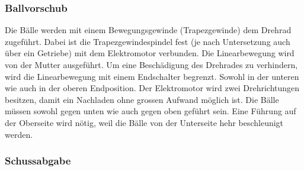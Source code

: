 \subsubsection{Ballvorschub}
Die Bälle werden mit einem Bewegungsgewinde (Trapezgewinde) dem Drehrad zugeführt. Dabei ist die Trapezgewindespindel fest (je nach Untersetzung auch über ein Getriebe) mit dem Elektromotor verbunden. Die Linearbewegung wird von der Mutter ausgeführt. Um eine Beschädigung des Drehrades zu verhindern, wird die Linearbewegung mit einem Endschalter begrenzt. Sowohl in der unteren wie auch in der oberen Endposition. Der Elektromotor wird zwei Drehrichtungen besitzen, damit ein Nachladen ohne grossen Aufwand möglich ist. Die Bälle müssen sowohl gegen unten wie auch gegen oben geführt sein. Eine Führung auf der Oberseite wird nötig, weil die Bälle von der Unterseite hehr beschleunigt werden.

\subsubsection{Schussabgabe}
